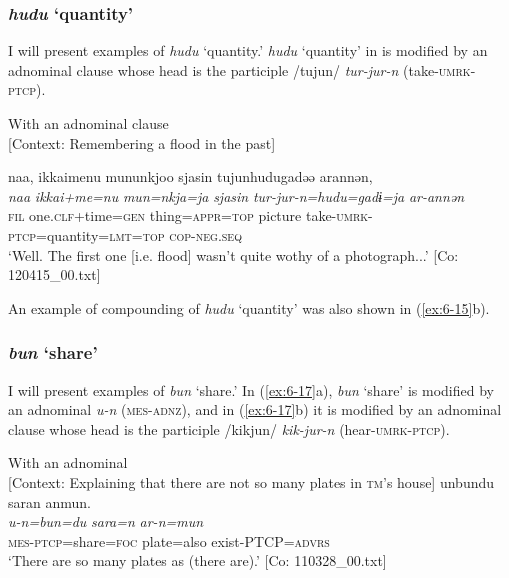 \subsubsection{\textit{hudu} ‘quantity’}

I will present examples of \textit{hudu} ‘quantity.’ \textit{hudu} ‘quantity’ in  is modified by an adnominal clause whose head is the participle /tujun/ \textit{tur-jur-n} (take-\textsc{umrk}-\textsc{ptcp}).

\ea\label{ex:6-16}
 With an adnominal clause\\{}
[Context: Remembering a flood in the past]

{\TM}
\glll naa,  {\textbar}ikkaime{\textbar}nu  mununkjoo  sjasin    tujunhudugadəə  arannən,\\
\textit{naa}  \textit{ikkai+me=nu}  \textit{mun=nkja=ja}  \textit{sjasin} \textit{tur-jur-n=hudu=gadɨ=ja}  \textit{ar-annən}\\
    \textsc{fil}  one.\textsc{clf}+time=\textsc{gen}  thing=\textsc{appr}=\textsc{top}  picture   take-\textsc{umrk}-\textsc{ptcp}=quantity=\textsc{lmt}=\textsc{top}  \textsc{cop}-\textsc{neg}.\textsc{seq}\\
\glt    ‘Well. The first one [i.e. flood] wasn’t quite wothy of a photograph...’ [Co: 120415\_00.txt]
\z

An example of compounding of \textit{hudu} ‘quantity’ was also shown in (\ref{ex:6-15}b).

\subsubsection{\textit{bun} ‘share’}

I will present examples of \textit{bun} ‘share.’ In (\ref{ex:6-17}a), \textit{bun} ‘share’ is modified by an adnominal \textit{u-n} (\textsc{mes}-\textsc{adnz}), and in (\ref{ex:6-17}b) it is modified by an adnominal clause whose head is the participle /kikjun/ \textit{kik-jur-n} (hear-\textsc{umrk}-\textsc{ptcp}).

\ea\label{ex:6-17}
\ea With an adnominal\\{}
[Context: Explaining that there are not so many plates in \textsc{tm}’s house]
{\TM}
\glll unbundu  saran  anmun.\\
      \textit{u-n=bun=du}  \textit{sara=n}  \textit{ar-n=mun}\\
      \textsc{mes}-\textsc{ptcp}=share=\textsc{foc}  plate=also  exist-PTCP=\textsc{advrs}\\
\glt ‘There are so many plates as (there are).’ [Co: 110328\_00.txt]

